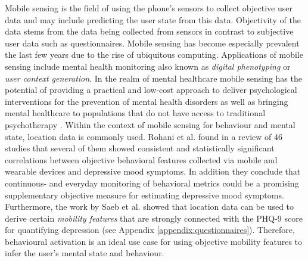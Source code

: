 Mobile sensing is the field of using the phone's sensors to collect objective user data and may include predicting the user state from this data. Objectivity of the data stems from the data being collected from sensors in contrast to subjective user data such as questionnaires. Mobile sensing has become especially prevalent the last few years due to the rise of ubiquitous computing. Applications of mobile sensing include mental health monitoring also known as \textit{digital phenotyping} or \textit{user context generation}. In the realm of mental healthcare mobile sensing has the potential of providing a practical and low-cost approach to deliver psychological interventions for the prevention of mental health disorders \cite{mobile-based-interventions} as well as bringing mental healthcare to populations that do not have access to traditional psychotherapy \cite{future-mental-health}. Within the context of mobile sensing for behaviour and mental state, location data is commonly used. Rohani et al. \cite{rohani2018-correlations} found in a review of 46 studies that several of them showed consistent and statistically significant correlations between objective behavioral features collected via mobile and wearable devices and depressive mood symptoms. In addition they conclude that continuous- and everyday monitoring of behavioral metrics could be a promising supplementary objective measure for estimating depressive mood symptoms. Furthermore, the work by Saeb et al. \cite{Saeb2015, saeb2016} showed that location data can be used to derive certain \textit{mobility features} that are strongly connected with the PHQ-9 score for quantifying depression (see Appendix \ref{appendix:questionnaires}). Therefore, behavioural activation is an ideal use case for using objective mobility features to infer the user's mental state and behaviour. \\

